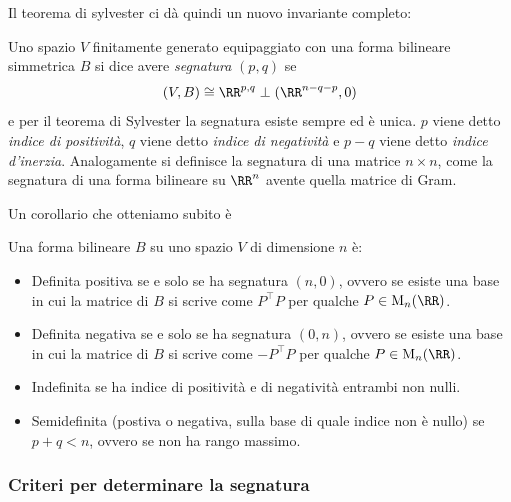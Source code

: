 \documentclass[11pt]{scrartcl}
\begin{document}
	Il teorema di sylvester ci dà quindi un nuovo invariante completo:
	\begin{definition}[Segnatura]
		Uno spazio $V$ finitamente generato equipaggiato con una forma bilineare simmetrica $B$ si dice avere \textit{segnatura} $(p,q)$ se 
		$$(V,B)\cong \RR^{p,q}\perp (\RR^{n-q-p},0)$$
		e per il teorema di Sylvester la segnatura esiste sempre ed è unica. $p$ viene detto \textit{indice di positività}, $q$ viene detto \textit{indice di negatività} e $p-q$ viene detto \textit{indice d'inerzia}. Analogamente si definisce la segnatura di una matrice $n\times n$, come la segnatura di una forma bilineare su $\RR^n$ avente quella matrice di Gram.
	\end{definition}
	Un corollario che otteniamo subito è
	\begin{corollary}
		Una forma bilineare $B$ su uno spazio $V$ di dimensione $n$ è:
		\begin{itemize}
			\item Definita positiva se e solo se ha segnatura $(n,0)$, ovvero se esiste una base in cui la matrice di $B$ si scrive come $P^\intercal P$ per qualche $P\in \text{M}_n(\RR)$. 
			\item Definita negativa se e solo se ha segnatura $(0,n)$, ovvero se esiste una base in cui la matrice di $B$ si scrive come $-P^\intercal P$ per qualche $P\in \text{M}_n(\RR)$.
			\item Indefinita se ha indice di positività e di negatività entrambi non nulli.
			\item Semidefinita (postiva o negativa, sulla base di quale indice non è nullo) se $p+q<n$, ovvero se non ha rango massimo.
		\end{itemize}
	\end{corollary}
	
	\subsubsection{Criteri per determinare la segnatura}
	
\end{document}
